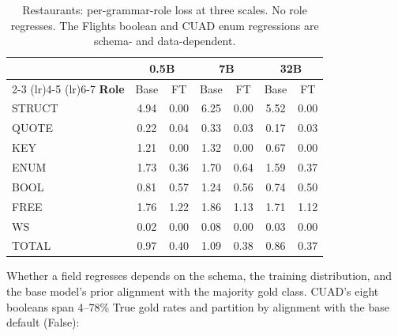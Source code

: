 \documentclass{article}
\begin{document}
\begin{table}[t]
\centering
\small
\begin{tabular}{lcccccc}
\toprule
 & \multicolumn{2}{c}{\textbf{0.5B}} & \multicolumn{2}{c}{\textbf{7B}} & \multicolumn{2}{c}{\textbf{32B}} \\
\cmidrule(lr){2-3} \cmidrule(lr){4-5} \cmidrule(lr){6-7}
\textbf{Role} & Base & FT & Base & FT & Base & FT \\
\midrule
STRUCT  & 4.94 & 0.00 & 6.25 & 0.00 & 5.52 & 0.00 \\
QUOTE   & 0.22 & 0.04 & 0.33 & 0.03 & 0.17 & 0.03 \\
KEY     & 1.21 & 0.00 & 1.32 & 0.00 & 0.67 & 0.00 \\
ENUM    & 1.73 & 0.36 & 1.70 & 0.64 & 1.59 & 0.37 \\
BOOL    & 0.81 & 0.57 & 1.24 & 0.56 & 0.74 & 0.50 \\
FREE    & 1.76 & 1.22 & 1.86 & 1.13 & 1.71 & 1.12 \\
WS      & 0.02 & 0.00 & 0.08 & 0.00 & 0.03 & 0.00 \\
\midrule
TOTAL   & 0.97 & 0.40 & 1.09 & 0.38 & 0.86 & 0.37 \\
\bottomrule
\end{tabular}
\caption{Restaurants: per-grammar-role loss at three scales. No role regresses. The Flights boolean and CUAD enum regressions are schema- and data-dependent.}
\label{tab:restaurants_decomp}
\end{table}

Whether a field regresses depends on the schema, the training distribution, and the base model's prior alignment with the majority gold class. CUAD's eight booleans span 4--78\% True gold rates and partition by alignment with the base default (False):
\end{document}

